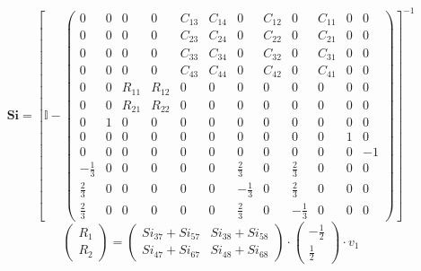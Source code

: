 \documentclass[10pt]{article} \usepackage{amsmath} \usepackage{bbold}
\begin{document}
\[ \mathbf{Si} = \left[ \mathbb{I}  -
\left(\begin{array}{cccccccccccc} 0 & 0 & 0 & 0 & C_{13} & C_{14} & 0
& C_{12} & 0 & C_{11} & 0 & 0 \\ 0 & 0 & 0 & 0 & C_{23} & C_{24} & 0 &
C_{22} & 0 & C_{21} & 0 & 0 \\ 0 & 0 & 0 & 0 & C_{33} & C_{34} & 0 &
C_{32} & 0 & C_{31} & 0 & 0 \\ 0 & 0 & 0 & 0 & C_{43} & C_{44} & 0 &
C_{42} & 0 & C_{41} & 0 & 0 \\ 0 & 0 & R_{11} & R_{12} & 0 & 0 & 0 & 0
& 0 & 0 & 0 & 0 \\ 0 & 0 & R_{21} & R_{22} & 0 & 0 & 0 & 0 & 0 & 0 & 0
& 0 \\ 0 & 1 & 0 & 0 & 0 & 0 & 0 & 0 & 0 & 0 & 0 & 0 \\ 0 & 0 & 0 & 0
& 0 & 0 & 0 & 0 & 0 & 0 & 1 & 0 \\ 0 & 0 & 0 & 0 & 0 & 0 & 0 & 0 & 0 &
0 & 0 & -1 \\ -\frac{1}{3} & 0 & 0 & 0 & 0 & 0 & \frac{2}{3} & 0 &
\frac{2}{3} & 0 & 0 & 0 \\ \frac{2}{3} & 0 & 0 & 0 & 0 & 0 &
-\frac{1}{3} & 0 & \frac{2}{3} & 0 & 0 & 0 \\ \frac{2}{3} & 0 & 0 & 0
& 0 & 0 & \frac{2}{3} & 0 & -\frac{1}{3} & 0 & 0 & 0
\end{array}\right) \right]^{-1} \]
\[ \left(\begin{array}{c} R_{1} \\ R_{2}
\end{array}\right)=\left(\begin{array}{cc} Si_{37} + Si_{57} & Si_{38}
+ Si_{58} \\ Si_{47} + Si_{67} & Si_{48} + Si_{68} \end{array}\right)
\cdot \left(\begin{array}{c} -\frac{1}{2} \\ \frac{1}{2}
\end{array}\right)\cdot v_{1} \]
\end{document}
